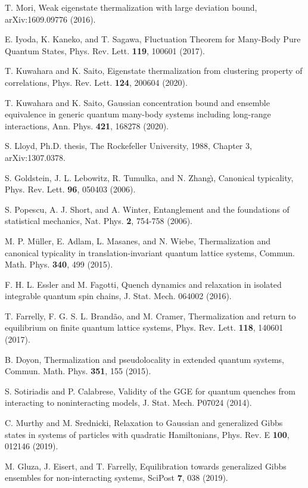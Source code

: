 \documentclass[twocolumn,aps,prb,floatfix,superscriptaddress]{revtex4-2}
\newcommand{\<}{\left\langle}	%
\renewcommand{\>}{\right\rangle}	%
\begin{document}
\begin{thebibliography}{70}
T. Mori,
Weak eigenstate thermalization with large deviation bound,
arXiv:1609.09776 (2016).

E. Iyoda, K. Kaneko, and T. Sagawa,
Fluctuation Theorem for Many-Body Pure Quantum States,
Phys. Rev. Lett. {\bf 119}, 100601 (2017).

T. Kuwahara and K. Saito,
Eigenstate thermalization from clustering property of correlations,
Phys. Rev. Lett. {\bf 124}, 200604 (2020).

T. Kuwahara and K. Saito,
Gaussian concentration bound and ensemble equivalence in generic quantum 
many-body systems including long-range interactions,
Ann. Phys. {\bf 421}, 168278 (2020).

S. Lloyd, Ph.D. thesis, The Rockefeller University, 1988,
Chapter 3, arXiv:1307.0378.

S. Goldstein, J. L. Lebowitz, R. Tumulka, and N. Zhang\`{\i},
Canonical typicality,
Phys. Rev. Lett. {\bf 96}, 050403 (2006).

S. Popescu, A. J. Short, and A. Winter,
Entanglement and the foundations of statistical mechanics,
Nat. Phys. {\bf 2}, 754-758 (2006).

M. P. M\"uller, E. Adlam, L. Masanes, and N. Wiebe,
Thermalization and canonical typicality in translation-invariant quantum lattice systems,
Commun. Math. Phys. {\bf 340}, 499 (2015).

F. H. L. Essler and M. Fagotti,
Quench dynamics and relaxation in isolated integrable quantum spin chains,
J. Stat. Mech. 064002 (2016).

T. Farrelly, F. G. S. L.  Brand\~ao, and M. Cramer,
Thermalization and return to equilibrium on finite quantum lattice systems,
Phys. Rev. Lett. {\bf 118}, 140601 (2017).

B. Doyon,
Thermalization and pseudolocality in extended quantum systems,
Commun. Math. Phys. {\bf 351}, 155 (2015).

S. Sotiriadis and P. Calabrese,
Validity of the GGE for quantum quenches from interacting to noninteracting models,
J. Stat. Mech. P07024 (2014).

C. Murthy and M. Srednicki,
Relaxation to Gaussian and generalized Gibbs states in systems of particles with quadratic Hamiltonians,
Phys. Rev. E {\bf 100}, 012146 (2019).

M. Gluza, J. Eisert, and T. Farrelly,
Equilibration towards generalized Gibbs ensembles for non-interacting systems,
SciPost {\bf 7}, 038 (2019).


\end{thebibliography}
\end{document}
